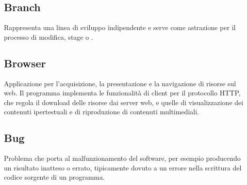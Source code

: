 \subsection*{Branch}
Rappresenta una linea di sviluppo indipendente e serve come astrazione per il processo di modifica, stage o .

\subsection*{Browser}
Applicazione per l'acquisizione, la presentazione e la navigazione di risorse sul web.
Il programma implementa le funzionalità di client per il protocollo HTTP, che regola il download delle risorse dai server web, e quelle di visualizzazione dei contenuti ipertestuali e di riproduzione di contenuti multimediali.

\subsection*{Bug}
Problema che porta al malfunzionamento del software, per esempio producendo un risultato inatteso o errato, tipicamente dovuto a un errore nella scrittura del codice sorgente di un programma. 




